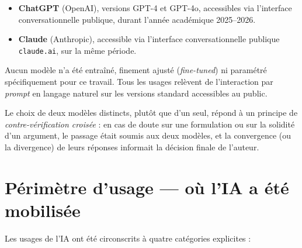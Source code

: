 \begin{itemize}
  \item \textbf{ChatGPT} (OpenAI), versions GPT-4 et GPT-4o, accessibles via l'interface conversationnelle publique, durant l'année académique 2025--2026.
  \item \textbf{Claude} (Anthropic), accessible via l'interface conversationnelle publique \texttt{claude.ai}, sur la même période.
\end{itemize}

Aucun modèle n'a été entraîné, finement ajusté (\emph{fine-tuned}) ni paramétré spécifiquement pour ce travail. Tous les usages relèvent de l'interaction par \emph{prompt} en langage naturel sur les versions standard accessibles au public.

Le choix de deux modèles distincts, plutôt que d'un seul, répond à un principe de \emph{contre-vérification croisée} : en cas de doute sur une formulation ou sur la solidité d'un argument, le passage était soumis aux deux modèles, et la convergence (ou la divergence) de leurs réponses informait la décision finale de l'auteur.

\section{Périmètre d'usage --- où l'IA a été mobilisée}

Les usages de l'IA ont été circonscrits à quatre catégories explicites :

